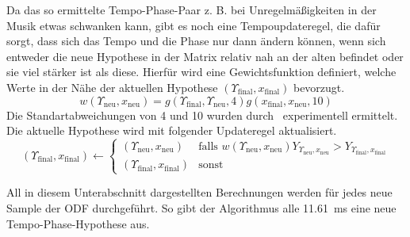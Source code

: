 {{{			%
			Da das so ermittelte Tempo-Phase-Paar  z. B. bei Unregelmä{\ss}igkeiten in der Musik etwas schwanken kann,
				gibt es noch eine Tempoupdateregel,
				die dafür sorgt,
				dass sich das Tempo und die Phase nur dann ändern können,
				wenn sich entweder die neue Hypothese in der Matrix relativ nah an der alten befindet
				oder sie viel stärker ist als diese.
			Hierfür wird eine Gewichtsfunktion definiert,
				welche Werte in der Nähe der aktuellen Hypothese $(\Upsilon_\text{final}, x_\text{final})$ bevorzugt.
			\begin{equation}
				w(\Upsilon_{\text{neu}}, x_{\text{neu}}) =
					g(\Upsilon_\text{final}, \Upsilon_{\text{neu}}, 4)
					g(x_\text{final}, x_{\text{neu}}, 10)
			\end{equation}
			Die Standartabweichungen von \num{4} und \num{10} wurden durch~\cite{2011_PlRoSt} experimentell ermittelt.
			Die aktuelle Hypothese wird mit folgender Updateregel aktualisiert.
			\begin{equation}
				(\Upsilon_\text{final}, x_\text{final}) \leftarrow
				\begin{cases}
					(\Upsilon_{\text{neu}}, x_{\text{neu}}) &
						\text{falls } w(\Upsilon_{\text{neu}}, x_{\text{neu}}) Y_{\Upsilon_{\text{neu}}, x_{\text{neu}}} >
							Y_{\Upsilon_\text{final}, x_\text{final}} \\
					(\Upsilon_\text{final}, x_\text{final}) &
						\text{sonst}
				\end{cases}
			\end{equation}

			All in diesem Unterabschnitt dargestellten Berechnungen werden für jedes neue Sample der \ac{ODF} durchgeführt.
			So gibt der Algorithmus alle \SI{11.61}{\milli\second} eine neue Tempo-Phase-Hypothese aus.
		}
	}
}
